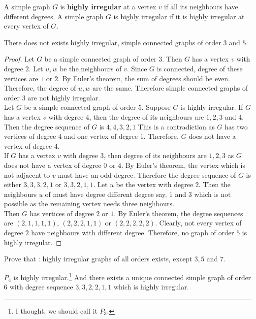 \begin{definition}
	A simple graph $G$ is \textbf{highly irregular} at a vertex $v$ if all its neighbours have different degrees. A simple graph $G$ is highly irregular if it is highly irregular at every vertex of $G$.
\end{definition}
\begin{exercise}
	There does not exists highly irregular, simple connected graphs of order $3$ and $5$. 
\end{exercise}
\begin{proof}
	Let $G$ be a simple connected graph of order $3$.
	Then $G$ has a vertex $v$ with degree $2$.
	Let $u,w$ be the neighbours of $v$.
	Since $G$ is connected, degree of these vertices are $1$ or $2$.
	By Euler's theorem, the sum of degrees should be even. Therefore, the degree of $u,w$ are the same. Therefore simple connected graphs of order $3$ are not highly irregular.\\

	Let $G$ be a simple connected graph of order $5$.
	Suppose $G$ is highly irregular.
	If $G$ has a vertex $v$ with degree $4$, then the degree of its neighbours are $1,2,3$ and $4$.
	Then the degree sequence of $G$ is $4,4,3,2,1$
	This is a contradiction as $G$ has two vertices of degree $4$ and one vertex of degree $1$.
	Therefore, $G$ does not have a vertex of degree $4$.\\

	If $G$ has a vertex $v$ with degree $3$, then degree of its neighbours are $1,2,3$ as $G$ does not have a vertex of degree $0$ or $4$. By Euler's theorem, the vertex which is not adjacent to $v$ must have an odd degree.
	Therefore the degree sequence of $G$ is either $3,3,3,2,1$ or $3,3,2,1,1$.
	Let $u$ be the vertex with degree $2$. Then the neighbours $u$ of must have degree different degree say, $1$ and $3$ which is not possible as the remaining vertex needs three neighbours.\\

	Then $G$ has vertices of degree $2$ or $1$.
	By Euler's theorem, the degree sequences are $(2,1,1,1,1)$, $(2,2,2,1,1)$ or $(2,2,2,2,2)$. Clearly, not every vertex of degree $2$ have neighbours with different degree. Therefore, no graph of order $5$ is highly irregular.
\end{proof}
\begin{challenge}
	Prove that : highly irregular graphs of all orders exists, except $3,5$ and $7$.
\end{challenge}
\begin{remark}
	$P_4$ is highly irregular.\footnote{I thought, we should call it $P_3$.}
	And there exists a unique connected simple graph of order $6$ with degree sequence $3,3,2,2,1,1$ which is  highly irregular.
\end{remark}

